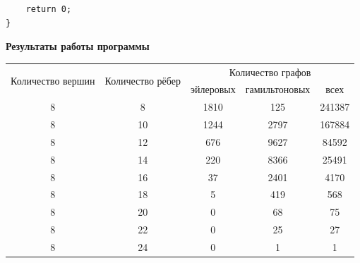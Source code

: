 \documentclass[a4paper,14pt]{extarticle}
\begin{document}
\begin{enumerate}[1.]
\begin{verbatim}
    return 0;
}
\end{verbatim}
\begin{center}\textbf{Результаты работы программы}\end{center}
          \begin{tabular}{|c|c|c|c|c|}
              \hline
              \multirow{2}{*}{Количество вершин} & \multirow{2}{*}{Количество рёбер} & \multicolumn{3}{|c|}{Количество графов}                          \\
              \cline{3-5}
                                                 &                                   & эйлеровых                               & гамильтоновых & всех   \\
              \hline
              8                                  & 8                                 & 1810                                    & 125           & 241387 \\
              \hline
              8                                  & 10                                & 1244                                    & 2797          & 167884 \\
              \hline
              8                                  & 12                                & 676                                     & 9627          & 84592  \\
              \hline
              8                                  & 14                                & 220                                     & 8366          & 25491  \\
              \hline
              8                                  & 16                                & 37                                      & 2401          & 4170   \\
              \hline
              8                                  & 18                                & 5                                       & 419           & 568    \\
              \hline
              8                                  & 20                                & 0                                       & 68            & 75     \\
              \hline
              8                                  & 22                                & 0                                       & 25            & 27     \\
              \hline
              8                                  & 24                                & 0                                       & 1             & 1      \\

\end{tabular}
\end{enumerate}
\end{document}
